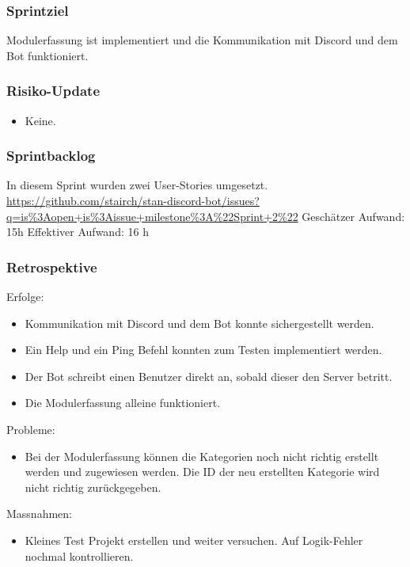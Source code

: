 \documentclass[a4paper, table]{article}
\begin{document}
\subsubsection*{Sprintziel}
Modulerfassung ist implementiert und die Kommunikation mit Discord und dem Bot funktioniert.

\subsubsection*{Risiko-Update}
\begin{itemize}
    \item Keine.
\end{itemize}

\subsubsection*{Sprintbacklog}
In diesem Sprint wurden zwei User-Stories umgesetzt.\\
\url{https://github.com/stairch/stan-discord-bot/issues?q=is%3Aopen+is%3Aissue+milestone%3A%22Sprint+2%22}
\newline
Geschätzer Aufwand: 15h
\newline
Effektiver Aufwand: 16 h

\subsubsection*{Retrospektive}
Erfolge:
\begin{itemize}
    \item Kommunikation mit Discord und dem Bot konnte sichergestellt werden.
    \item Ein Help und ein Ping Befehl konnten zum Testen implementiert werden.
    \item Der Bot schreibt einen Benutzer direkt an, sobald dieser den Server betritt.
    \item Die Modulerfassung alleine funktioniert.
\end{itemize}
Probleme:
\begin{itemize}
    \item Bei der Modulerfassung können die Kategorien noch nicht richtig erstellt werden und zugewiesen werden.
    Die ID der neu erstellten Kategorie wird nicht richtig zurückgegeben.
\end{itemize}
Massnahmen:
\begin{itemize}
    \item Kleines Test Projekt erstellen und weiter versuchen. Auf Logik-Fehler nochmal kontrollieren.
\end{itemize}
\newpage
\end{document}
